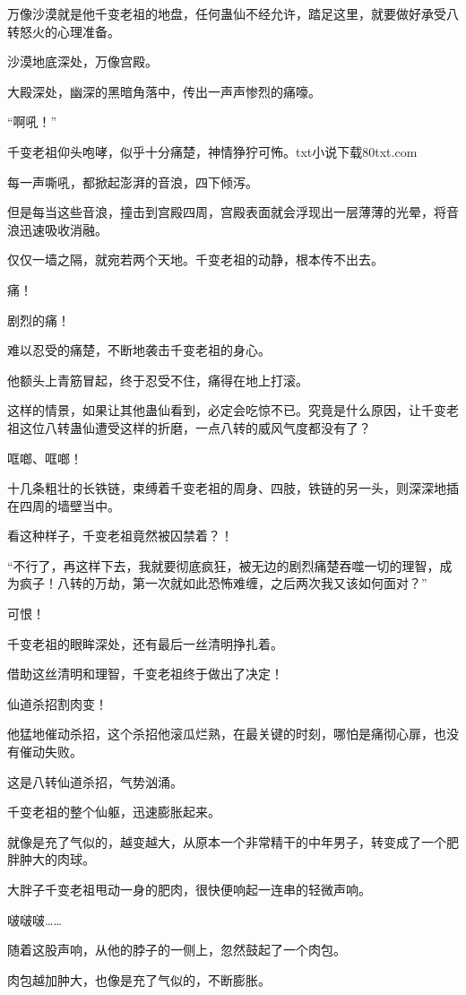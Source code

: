 \begin{this_body}
万像沙漠就是他千变老祖的地盘，任何蛊仙不经允许，踏足这里，就要做好承受八转怒火的心理准备。

沙漠地底深处，万像宫殿。

大殿深处，幽深的黑暗角落中，传出一声声惨烈的痛嚎。

“啊吼！”

千变老祖仰头咆哮，似乎十分痛楚，神情狰狞可怖。txt小说下载80txt.com

每一声嘶吼，都掀起澎湃的音浪，四下倾泻。

但是每当这些音浪，撞击到宫殿四周，宫殿表面就会浮现出一层薄薄的光晕，将音浪迅速吸收消融。

仅仅一墙之隔，就宛若两个天地。千变老祖的动静，根本传不出去。

痛！

剧烈的痛！

难以忍受的痛楚，不断地袭击千变老祖的身心。

他额头上青筋冒起，终于忍受不住，痛得在地上打滚。

这样的情景，如果让其他蛊仙看到，必定会吃惊不已。究竟是什么原因，让千变老祖这位八转蛊仙遭受这样的折磨，一点八转的威风气度都没有了？

哐啷、哐啷！

十几条粗壮的长铁链，束缚着千变老祖的周身、四肢，铁链的另一头，则深深地插在四周的墙壁当中。

看这种样子，千变老祖竟然被囚禁着？！

“不行了，再这样下去，我就要彻底疯狂，被无边的剧烈痛楚吞噬一切的理智，成为疯子！八转的万劫，第一次就如此恐怖难缠，之后两次我又该如何面对？”

可恨！

千变老祖的眼眸深处，还有最后一丝清明挣扎着。

借助这丝清明和理智，千变老祖终于做出了决定！

仙道杀招割肉变！

他猛地催动杀招，这个杀招他滚瓜烂熟，在最关键的时刻，哪怕是痛彻心扉，也没有催动失败。

这是八转仙道杀招，气势汹涌。

千变老祖的整个仙躯，迅速膨胀起来。

就像是充了气似的，越变越大，从原本一个非常精干的中年男子，转变成了一个肥胖肿大的肉球。

大胖子千变老祖甩动一身的肥肉，很快便响起一连串的轻微声响。

啵啵啵……

随着这股声响，从他的脖子的一侧上，忽然鼓起了一个肉包。

肉包越加肿大，也像是充了气似的，不断膨胀。


\end{this_body}
